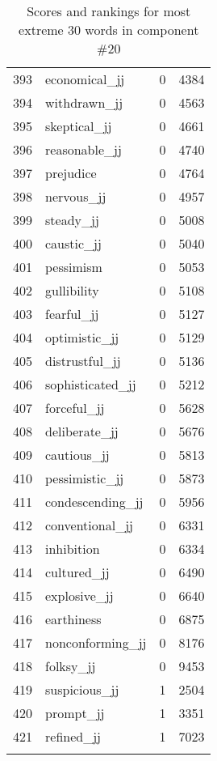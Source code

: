 \begin{longtable}[!htbp]{| rlr@{.}l |}
    393 & economical\_jj & 0 & 4384 \\
    394 & withdrawn\_jj & 0 & 4563 \\
    395 & skeptical\_jj & 0 & 4661 \\
    396 & reasonable\_jj & 0 & 4740 \\
    397 & prejudice & 0 & 4764 \\
    398 & nervous\_jj & 0 & 4957 \\
    399 & steady\_jj & 0 & 5008 \\
    400 & caustic\_jj & 0 & 5040 \\
    401 & pessimism & 0 & 5053 \\
    402 & gullibility & 0 & 5108 \\
    403 & fearful\_jj & 0 & 5127 \\
    404 & optimistic\_jj & 0 & 5129 \\
    405 & distrustful\_jj & 0 & 5136 \\
    406 & sophisticated\_jj & 0 & 5212 \\
    407 & forceful\_jj & 0 & 5628 \\
    408 & deliberate\_jj & 0 & 5676 \\
    409 & cautious\_jj & 0 & 5813 \\
    410 & pessimistic\_jj & 0 & 5873 \\
    411 & condescending\_jj & 0 & 5956 \\
    412 & conventional\_jj & 0 & 6331 \\
    413 & inhibition & 0 & 6334 \\
    414 & cultured\_jj & 0 & 6490 \\
    415 & explosive\_jj & 0 & 6640 \\
    416 & earthiness & 0 & 6875 \\
    417 & nonconforming\_jj & 0 & 8176 \\
    418 & folksy\_jj & 0 & 9453 \\
    419 & suspicious\_jj & 1 & 2504 \\
    420 & prompt\_jj & 1 & 3351 \\
    421 & refined\_jj & 1 & 7023 \\
    \hline
    \caption{Scores and rankings for most extreme 30 words in component \#20} \\
\end{longtable}
